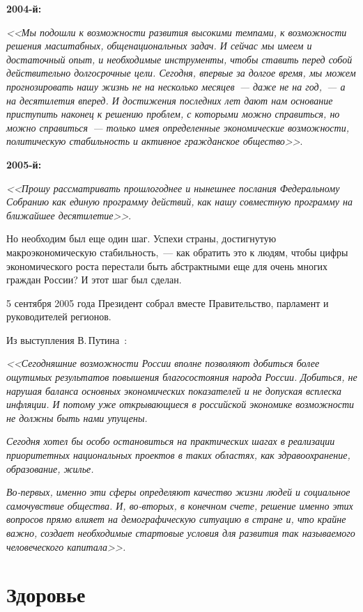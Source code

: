 \documentclass[article, 12pt, russian, oneside]{ncc}
\begin{document}
\textbf{2004-й:}

\emph{<<Мы подошли к возможности развития высокими темпами, к
  возможности решения масштабных, общенациональных задач. И сейчас мы
  имеем и достаточный опыт, и необходимые инструменты, чтобы ставить
  перед собой действительно долгосрочные цели. Сегодня, впервые за
  долгое время, мы можем прогнозировать нашу жизнь не на несколько
  месяцев~--- даже не на год,~--- а на десятилетия вперед. И
  достижения последних лет дают нам основание приступить наконец к
  решению проблем, с которыми можно справиться, но можно
  справиться~--- только имея определенные экономические возможности,
  политическую стабильность и активное гражданское
  общество>>}\cite{Putin_2004}.

\textbf{2005-й:}

\emph{<<Прошу рассматривать прошлогоднее и нынешнее послания
  Федеральному Собранию как единую программу действий, как нашу
  совместную программу на ближайшее десятилетие>>}\cite{Putin_2005}.

Но необходим был еще один шаг. Успехи страны, достигнутую
макроэкономическую стабильность,~--- как обратить это к людям, чтобы
цифры экономического роста перестали быть абстрактными еще для очень
многих граждан России? И этот шаг был сделан.

5 сентября 2005 года Президент собрал вместе Правительство, парламент
и руководителей регионов.

Из выступления В.\,Путина~\cite{Putin_Gov}:

\emph{<<Сегодняшние возможности России вполне позволяют добиться более
  ощутимых результатов повышения благосостояния народа
  России. Добиться, не нарушая баланса основных экономических
  показателей и не допуская всплеска инфляции. И потому уже
  открывающиеся в российской экономике возможности не должны быть нами
  упущены.}
    
\emph{Сегодня хотел бы особо остановиться на практических шагах в
  реализации приоритетных национальных проектов в таких областях, как
  здравоохранение, образование, жилье.}

\emph{Во-первых, именно эти сферы определяют качество жизни людей и
  социальное самочувствие общества. И, во-вторых, в конечном счете,
  решение именно этих вопросов прямо влияет на демографическую
  ситуацию в стране и, что крайне важно, создает необходимые стартовые
  условия для развития так называемого человеческого капитала>>.}
\newpage


\section{Здоровье}
\end{document}
